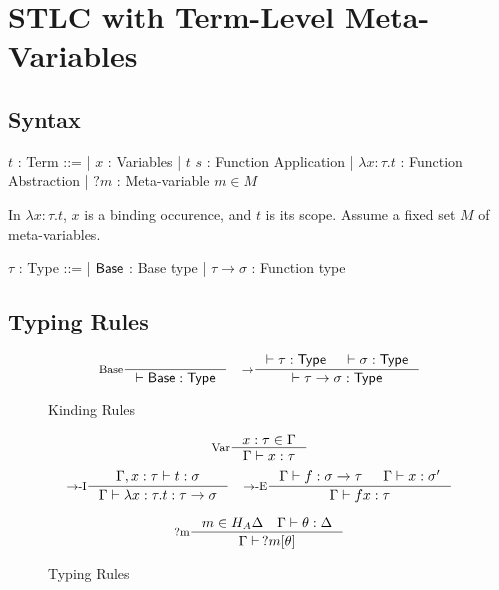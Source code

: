 \section{STLC with Term-Level Meta-Variables}

\subsection{Syntax}
\begin{bnf}
$t$ : \textsf{Term} ::=
| $x$ : Variables
| $t$ $s$ : Function Application
| $\lambda x \colon \tau. t$ : Function Abstraction
| $?m$ : Meta-variable $m \in M$
\end{bnf}

\hfill\break
In $\lambda x \colon \tau. t$, $x$ is a binding occurence, and $t$ is its scope.
Assume a fixed set $M$ of meta-variables.
\hfill\break

\noindent
\begin{bnf}
$\tau$ : \textsf{Type} ::=
| $\mathsf{Base}$ : Base type
| $\tau \to \sigma$ : Function type
\end{bnf}

\hfill\break


\subsection{Typing Rules}
\begin{figure*}[h]
   \[
    \inference[Base]{}
                    {\vdash \Base : \Type}
    \quad
    \inference[$\to$]{\vdash \tau : \Type & \vdash \sigma : \Type}
                     {\vdash \tau \to \sigma : \Type}
  \]
  \caption*{Kinding Rules}
  \label{fig:term-mvar-stlc-kinding}
\end{figure*}


\begin{figure*}[h]
  \[
    \inference[Var]{x : \tau \in \Gamma}
                   {\Gamma \vdash x : \tau}
  \]
  \[
    \inference[\Intro{$\to$}]{\Gamma, x : \tau \vdash t : \sigma}
                             {\Gamma \vdash \lambda x : \tau. t : \tau \to \sigma}
    \quad
    \inference[\Elim{$\to$}]{\Gamma \vdash f : \sigma \to \tau & \Gamma \vdash x : \sigma'}
                            {\Gamma \vdash f x : \tau}
  \]

  \[
  \inference[?m]
            {m \in H_A\Delta \quad \Gamma \vdash \theta : \Delta}
            {\Gamma \vdash \,?m[\theta]}
  \]

  \caption*{Typing Rules}
  \label{fig:term-mvar-stlc-typing}
\end{figure*}

